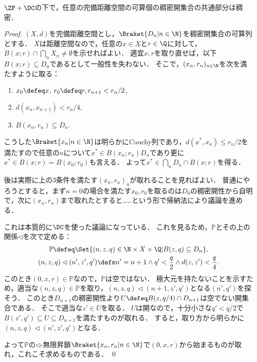 \documentclass[a4j,leqno]{ltjsarticle}
\begin{document}
\begin{theorem}[ZF+DC]
 $\ZF+\DC$の下で，任意の完備距離空間の可算個の稠密開集合の共通部分は稠密．
\end{theorem}
\begin{proof}
 $(X, d)$を完備距離空間とし，$\Braket{D_n | n \in \N}$を稠密開集合の可算列とする．
 $X$は距離空間なので，任意の$x \in X$と$r \in \Q$に対して，$B(x; r) \cap \bigcap_n X_n \neq \emptyset$を示せればよい．
 適宜$x, r$を取り直せば，以下$B(x; r) \subseteq D_0$であるとして一般性を失わない．
 そこで，$(x_n, r_n)_{n \in \N}$を次を満たすように取る：
 \begin{enumerate}
  \item $x_0 \defeq x$, $r_0 \defeq r, r_{n+1}< r_n/2$,
  \item $d(x_n, x_{n+1}) < r_n/4$,
  \item $B(x_n, r_n) \subseteq D_n$.
 \end{enumerate}
 こうした$\Braket{x_n | n \in \N}$は明らかにCauchy列であり，$d(x^*, x_n) \leq r_n / 2$を満たすので任意の$n$について$x^* \in B(x_n; r_n) D_n$であり更に$x^* \in B(x; r) = B(x_0; r_0)$も言える．
 よって$x^* \in \bigcap_n D_n \cap B(x; r)$を得る．

 後は実際に上の3条件を満たす$(x_n, r_n)_n$が取れることを見ればよい．
 普通にやろうとすると，まず$n = 0$の場合を満たす$x_0, r_0$を取るのは$D_0$の稠密開性から自明で，次に$(x_n, r_n)$まで取れたとすると……という形で帰納法により議論を進める．

 これは本質的に$\DC$を使った議論になっている．
 これを見るため，$\mathbb{P}$とその上の関係$\lhd$を次で定める：
 \begin{gather*}
  \mathbb{P} \defeq \Set{(n, z, q) \in \N \times X \times \Q | B(z, q) \subseteq D_{n} },\\
  (n, z, q) \lhd (n', z', q') \defs
  n' = n + 1 \land q' < \frac{q}{2} \land d(z, z') < \frac{q}{4}.
 \end{gather*}
 このとき$(0, x, r) \in \mathbb{P}$なので，$\mathbb{P}$は空ではない．
 極大元を持たないことを示すため，適当な$(n, z, q) \in \mathbb{P}$を取り，$(n, z, q) \lhd (n+1, z', q')$となる$(n', q')$を探そう．
 このとき$D_{n+1}$の稠密開性より$U \defeq B(z, q/4) \cap D_{n+1}$は空でない開集合である．
 そこで適当な$z' \in U$を取る．
 $U$は開なので，十分小さな$q' < q/2$で$B(z', q') \subseteq U \subseteq D_{n+1}$を満たすものが取れる．
 すると，取り方から明らかに$(n, z, q) \lhd (n', z', q')$となる．

 よって$\mathbb{P}$の$\lhd$-無限昇鎖$\Braket{x_n, r_n | n \in \N}$で$(0, x, r)$から始まるものが取れ，これこそ求めるものである． \qed
\end{proof}
\end{document}
